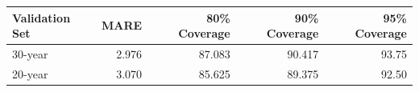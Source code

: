 \begin{table}[!h]
\centering
\begin{tabular}{l|r|r|r|r}
\hline
Validation Set & MARE & 80\% Coverage & 90\% Coverage & 95\% Coverage\\
\hline
30-year & 2.976 & 87.083 & 90.417 & 93.75\\
20-year & 3.070 & 85.625 & 89.375 & 92.50\\
\hline
\end{tabular}
\end{table}
